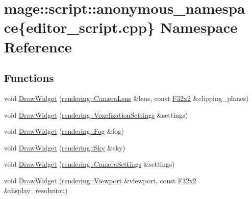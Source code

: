 \hypertarget{namespacemage_1_1script_1_1anonymous__namespace_02editor__script_8cpp_03}{}\section{mage\+:\+:script\+:\+:anonymous\+\_\+namespace\{editor\+\_\+script.\+cpp\} Namespace Reference}
\label{namespacemage_1_1script_1_1anonymous__namespace_02editor__script_8cpp_03}
\subsection*{Functions}
\begin{DoxyCompactItemize}
\item 
void \mbox{\hyperlink{namespacemage_1_1script_1_1anonymous__namespace_02editor__script_8cpp_03_a3ddaba161729b3337a0aef8c3d0dc7af}{Draw\+Widget}} (\mbox{\hyperlink{classmage_1_1rendering_1_1_camera_lens}{rendering\+::\+Camera\+Lens}} \&lens, const \mbox{\hyperlink{namespacemage_a9dc0d34d6ecc87e4cfa4a826102117bc}{F32x2}} \&clipping\+\_\+planes)
\item 
void \mbox{\hyperlink{namespacemage_1_1script_1_1anonymous__namespace_02editor__script_8cpp_03_a9cadccc3d2af5d50a3909613fa99a378}{Draw\+Widget}} (\mbox{\hyperlink{classmage_1_1rendering_1_1_voxelization_settings}{rendering\+::\+Voxelization\+Settings}} \&settings)
\item 
void \mbox{\hyperlink{namespacemage_1_1script_1_1anonymous__namespace_02editor__script_8cpp_03_a1e931eee19681c54e04ae1d4cdf18a72}{Draw\+Widget}} (\mbox{\hyperlink{classmage_1_1rendering_1_1_fog}{rendering\+::\+Fog}} \&fog)
\item 
void \mbox{\hyperlink{namespacemage_1_1script_1_1anonymous__namespace_02editor__script_8cpp_03_a73c0a74def0eed21038c2cca663ffe51}{Draw\+Widget}} (\mbox{\hyperlink{classmage_1_1rendering_1_1_sky}{rendering\+::\+Sky}} \&sky)
\item 
void \mbox{\hyperlink{namespacemage_1_1script_1_1anonymous__namespace_02editor__script_8cpp_03_ae74de846ef39719a29e31cebc10c091c}{Draw\+Widget}} (\mbox{\hyperlink{classmage_1_1rendering_1_1_camera_settings}{rendering\+::\+Camera\+Settings}} \&settings)
\item 
void \mbox{\hyperlink{namespacemage_1_1script_1_1anonymous__namespace_02editor__script_8cpp_03_a8b34458ebab3e5b7d86daec0cae877f1}{Draw\+Widget}} (\mbox{\hyperlink{classmage_1_1rendering_1_1_viewport}{rendering\+::\+Viewport}} \&viewport, const \mbox{\hyperlink{namespacemage_a9dc0d34d6ecc87e4cfa4a826102117bc}{F32x2}} \&display\+\_\+resolution)

\end{DoxyCompactItemize}
